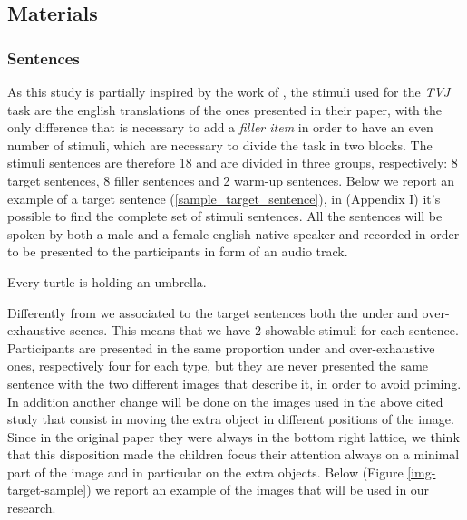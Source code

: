 \documentclass[10pt, a4]{article}
\begin{document}
\subsection{Materials}
\subsubsection{Sentences}
As this study is partially inspired by the work of \cite{minai2012hinders}, the stimuli used for the \textit{TVJ} task are the
english translations of the ones presented in their paper, with the only difference that is necessary to add a
\textit{filler item} in order to have an even number of stimuli, which are necessary to divide the task in two blocks.
The stimuli sentences are therefore 18 and are divided in three groups, respectively: 8 target sentences, 8 filler sentences
and 2 warm-up sentences. Below we report an example of a target sentence (\ref{sample_target_sentence}), in (Appendix I) it's possible
to find the complete set of stimuli sentences. All the sentences will be spoken by both a male and a female english native speaker and
recorded in order to be presented to the participants in form of an audio track.

\begin{exe}
    \ex  Every turtle is holding an umbrella. \label{sample_target_sentence}
\end{exe}

Differently from \cite{minai2012hinders} we associated to the target sentences both the under and over-exhaustive scenes. This means
that we have 2 showable stimuli for each sentence. Participants are presented in the same proportion under and over-exhaustive ones,
respectively four for each type, but they are never presented the same sentence with the two different images that describe it, in order to avoid priming.
In addition another change will be done on the images used in the above cited study that consist in moving the extra object in different positions
of the image. Since in the original paper they were always in the bottom right lattice, we think that this disposition made the children focus their
attention always on a minimal part of the image and in particular on the extra objects. Below (Figure \ref{img-target-sample}) we report an example of the images that
will be used in our research.
\end{document}
